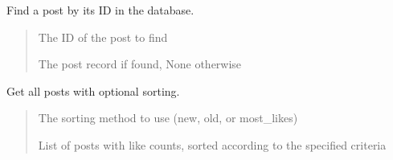 \documentclass[letterpaper,10pt,openany,oneside,english]{sphinxmanual}
\begin{document}

\begin{savenotes}\begin{fulllineitems}
\label{\detokenize{modules/routers:storeapi.routers.post.find_post}}
\pysigstartsignatures
{}
\pysigstopsignatures
\sphinxAtStartPar
Find a post by its ID in the database.
\begin{quote}\begin{description}
\sphinxAtStartPar
{} \textendash{} The ID of the post to find

\sphinxAtStartPar
The post record if found, None otherwise

\end{description}\end{quote}

\end{fulllineitems}\end{savenotes}


\begin{savenotes}\begin{fulllineitems}
\label{\detokenize{modules/routers:storeapi.routers.post.get_all_posts}}
\pysigstartsignatures
{}
\pysigstopsignatures
\sphinxAtStartPar
Get all posts with optional sorting.
\begin{quote}\begin{description}
\sphinxAtStartPar
{} \textendash{} The sorting method to use (new, old, or most\_likes)

\sphinxAtStartPar
List of posts with like counts, sorted according to the specified criteria

\end{description}\end{quote}

\end{fulllineitems}\end{savenotes}
\end{document}
